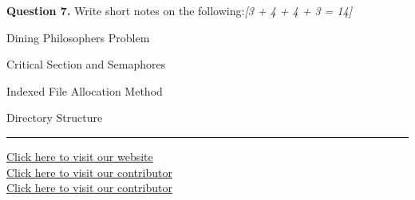 \documentclass[11pt,a4paper]{article}
\newcommand{\pts}[1]{\hfill   \textit{[#1]}}
\begin{document}
\medskip


\noindent   \textbf{Question 7.} Write short notes on the following:\pts{3 + 4 + 4 + 3 = 14}

\begin{parts}
  \item Dining Philosophers Problem
  \item Critical Section and Semaphores
  \item Indexed File Allocation Method
  \item Directory Structure
\end{parts}

\vfill
\rule{\linewidth}{0.4pt}

\begin{center}\small
\href{https://bhu-exam.vercel.app/}{Click here to visit our website}\\[4pt]\href{https://me-aryan.vercel.app/}{Click here to visit our contributor}\\[4pt]\href{https://quashan-me.vercel.app/}{Click here to visit our contributor}
\end{center}
\end{document}
